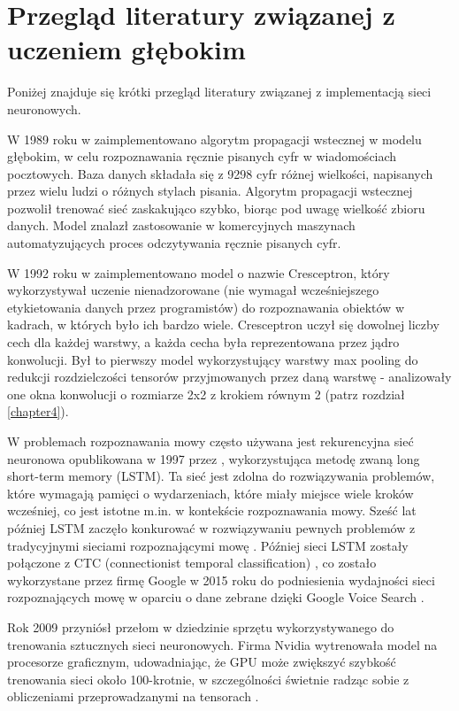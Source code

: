 \section{Przegląd literatury związanej z uczeniem głębokim}

Poniżej znajduje się krótki przegląd literatury związanej z implementacją sieci neuronowych.

W 1989 roku w \cite{BackpropagationLeCun} zaimplementowano algorytm propagacji wstecznej w modelu głębokim, w celu rozpoznawania ręcznie pisanych cyfr w wiadomościach pocztowych. Baza danych składała się z 9298 cyfr różnej wielkości, napisanych przez wielu ludzi o różnych stylach pisania. Algorytm propagacji wstecznej pozwolił trenować sieć zaskakująco szybko, biorąc pod uwagę wielkość zbioru danych. Model znalazł zastosowanie w komercyjnych maszynach automatyzujących proces odczytywania ręcznie pisanych cyfr.

W 1992 roku w \cite{Cresceptron} zaimplementowano model o nazwie Cresceptron, który wykorzystywał uczenie nienadzorowane (nie wymagał wcześniejszego etykietowania danych przez programistów) do rozpoznawania obiektów w kadrach, w których było ich bardzo wiele. Cresceptron uczył się dowolnej liczby cech dla każdej warstwy, a każda cecha była reprezentowana przez jądro konwolucji. Był to pierwszy model wykorzystujący warstwy max pooling do redukcji rozdzielczości tensorów przyjmowanych przez daną warstwę - analizowały one okna konwolucji o rozmiarze 2x2 z krokiem równym 2 (patrz rozdział \ref{chapter4}). 

W problemach rozpoznawania mowy często używana jest rekurencyjna sieć neuronowa opublikowana w 1997 przez \cite{LSTMSchmidhuber}, wykorzystująca metodę zwaną long short-term memory (LSTM). Ta sieć jest zdolna do rozwiązywania problemów, które wymagają pamięci o wydarzeniach, które miały miejsce wiele kroków wcześniej, co jest istotne m.in. w kontekście rozpoznawania mowy. Sześć lat później LSTM zaczęło konkurować w rozwiązywaniu pewnych problemów z tradycyjnymi sieciami rozpoznającymi mowę \cite{LSTMGraves}. Później sieci LSTM zostały połączone z CTC (connectionist temporal classification) \cite{CTC}, co zostało wykorzystane przez firmę Google w 2015 roku do podniesienia wydajności sieci rozpoznających mowę w oparciu o dane zebrane dzięki Google Voice Search \cite{GVS}.

Rok 2009 przyniósł przełom w dziedzinie sprzętu wykorzystywanego do trenowania sztucznych sieci neuronowych. Firma Nvidia wytrenowała model na procesorze graficznym, udowadniając, że GPU może zwiększyć szybkość trenowania sieci około 100-krotnie, w szczególności świetnie radząc sobie z obliczeniami przeprowadzanymi na tensorach \cite{GPUOh}. 
